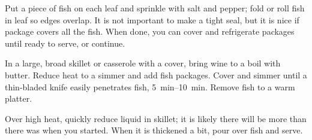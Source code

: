 Put a piece of fish on each leaf and sprinkle with salt and pepper; fold or roll
fish in leaf so edges overlap. It is not important to make a tight seal, but it
is nice if package covers all the fish. When done, you can cover and refrigerate
packages until ready to serve, or continue.

In a large, broad skillet or casserole with a cover, bring wine to a boil with
butter. Reduce heat to a simmer and add fish packages. Cover and simmer until a
thin-bladed knife easily penetrates fish, \SIrange{5}{10}{\minute}. Remove fish
to a warm platter.

Over high heat, quickly reduce liquid in skillet; it is likely there will be
more than there was when you started. When it is thickened a bit, pour over fish
and serve.